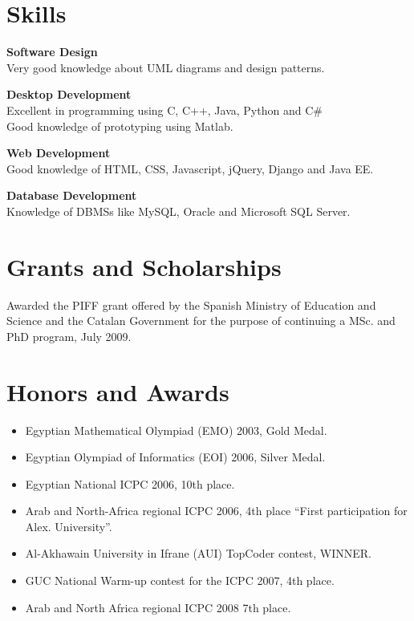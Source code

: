\documentclass{res}
\begin{document}
\begin{resume}
\section{Skills}
    {\bf Software Design}\\
    Very good knowledge about UML diagrams and design patterns.

    {\bf Desktop Development}\\
    Excellent in programming using C, C++, Java, Python and C\#\\
    Good knowledge of prototyping using Matlab.

    {\bf Web Development}\\
    Good knowledge of HTML, CSS, Javascript, jQuery, Django and Java EE.

    {\bf Database Development}\\
    Knowledge of DBMSs like MySQL, Oracle and Microsoft SQL Server.\\
 
\section{Grants and Scholarships}

Awarded the PIFF grant offered by the Spanish Ministry of Education and Science and the Catalan Government for the purpose of continuing a
MSc. and PhD program, July 2009.

\section{Honors and Awards}
    \begin{itemize}
    \item Egyptian Mathematical Olympiad (EMO) 2003, Gold Medal.
    \item Egyptian Olympiad of Informatics (EOI) 2006, Silver Medal.
    \item Egyptian National ICPC 2006, 10th place.
    \item Arab and North-Africa regional ICPC 2006, 4th place “First participation for Alex. University”.
    \item Al-Akhawain University in Ifrane (AUI) TopCoder contest, WINNER.
    \item GUC National Warm-up contest for the ICPC 2007, 4th place.
    \item Arab and North Africa regional ICPC 2008 7th place.
    \end{itemize}
 

\end{resume}
\end{document}
